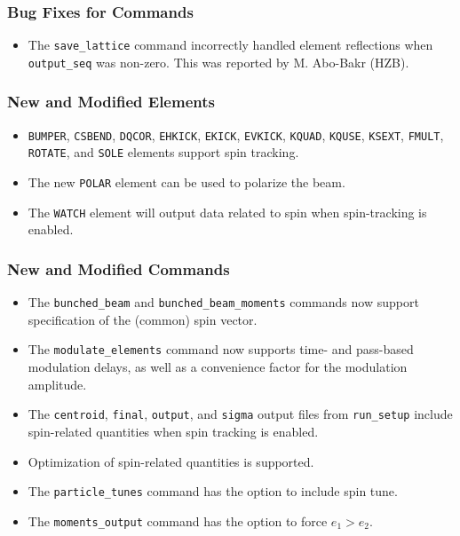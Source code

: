 \documentclass[11pt]{article}
\begin{document}
\subsubsection{Bug Fixes for Commands}
\begin{itemize}
\item The \verb|save_lattice| command incorrectly handled element reflections when \verb|output_seq| was non-zero.
  This was reported by M. Abo-Bakr (HZB).
\end{itemize}

\subsubsection{New and Modified Elements}
\begin{itemize}
\item \verb|BUMPER|, \verb|CSBEND|, \verb|DQCOR|, \verb|EHKICK|, \verb|EKICK|, \verb|EVKICK|, \verb|KQUAD|, \verb|KQUSE|, \verb|KSEXT|,
  \verb|FMULT|, \verb|ROTATE|, and \verb|SOLE| elements support spin tracking. 
\item The new \verb|POLAR| element can be used to polarize the beam.
\item The \verb|WATCH| element will output data related to spin when spin-tracking is enabled.
\end{itemize}

\subsubsection{New and Modified Commands}
\begin{itemize}
\item The \verb|bunched_beam| and \verb|bunched_beam_moments| commands now support specification of the (common) spin vector.
\item The \verb|modulate_elements| command now supports time- and pass-based modulation delays, as well as a convenience
  factor for the modulation amplitude.
\item The \verb|centroid|, \verb|final|, \verb|output|, and \verb|sigma| output files from \verb|run_setup| include
  spin-related quantities when spin tracking is enabled.
\item Optimization of spin-related quantities is supported.
\item The \verb|particle_tunes| command has the option to include spin tune.
\item The \verb|moments_output| command has the option to force $e_1>e_2$.
\end{itemize}
\end{document}

